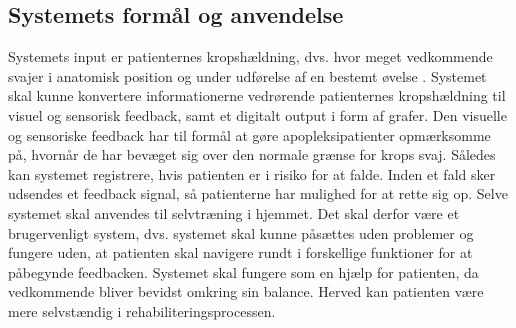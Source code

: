 \subsection{Systemets formål og anvendelse}
Systemets input er patienternes kropshældning, dvs. hvor meget vedkommende svajer i anatomisk position og under udførelse af en bestemt øvelse . Systemet skal kunne konvertere informationerne vedrørende patienternes kropshældning til visuel og sensorisk feedback, samt et digitalt output i form af grafer. Den visuelle og sensoriske feedback har til formål at gøre apopleksipatienter opmærksomme på, hvornår de har bevæget sig over den normale grænse for krops svaj. Således kan systemet registrere, hvis patienten er i risiko for at falde. Inden et fald sker udsendes et feedback signal, så patienterne har mulighed for at rette sig op. Selve systemet skal anvendes til selvtræning i hjemmet. Det skal derfor være et brugervenligt system, dvs. systemet skal kunne påsættes uden problemer og fungere uden, at patienten skal navigere rundt i forskellige funktioner for at påbegynde feedbacken. Systemet skal fungere som en hjælp for patienten, da vedkommende bliver bevidst omkring sin balance. Herved kan patienten være mere selvstændig i rehabiliteringsprocessen.

